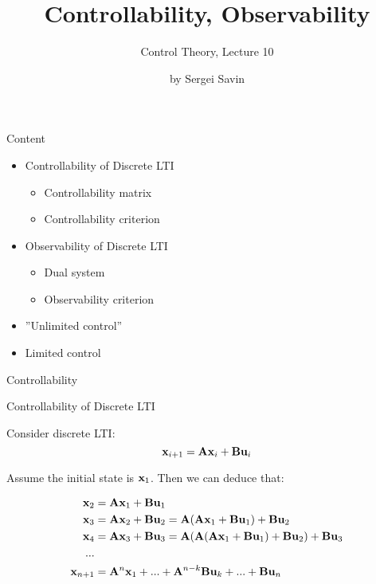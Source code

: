 \documentclass{beamer}
\title{Controllability, Observability}
\subtitle{Control Theory, Lecture 10}
\author{by Sergei Savin}
\date{\mydate}
\begin{document}
\maketitle


\begin{frame}{Content}
\begin{itemize}
\item Controllability of Discrete LTI
\begin{itemize}
    \item Controllability matrix
    \item Controllability criterion
\end{itemize}
\item Observability of Discrete LTI
\begin{itemize}
    \item Dual system
    \item Observability criterion
\end{itemize}
\item ”Unlimited control”
\item Limited control
\end{itemize}
\end{frame}



\begin{frame}{Controllability}
	\begin{flushleft}
		
		
		
	\end{flushleft}
\end{frame}


\begin{frame}{Controllability of Discrete LTI}
\begin{flushleft}

Consider discrete LTI:
\begin{equation}
\mathbf{x}_{i+1} = \mathbf{A}  \mathbf{x}_i + \mathbf{B} \mathbf{u}_i
\end{equation}

Assume the initial state is $\mathbf{x}_1$. Then we can deduce that:

\begin{align*}
\mathbf{x}_2 &= \mathbf{A} \mathbf{x}_1 + \mathbf{B} \mathbf{u}_1 \\
\mathbf{x}_3 &= \mathbf{A} \mathbf{x}_2 + \mathbf{B} \mathbf{u}_2 = \mathbf{A} (\mathbf{A} \mathbf{x}_1 + \mathbf{B} \mathbf{u}_1) + \mathbf{B} \mathbf{u}_2 \\
\mathbf{x}_4 &= \mathbf{A} \mathbf{x}_3 + \mathbf{B} \mathbf{u}_3 = \mathbf{A} (\mathbf{A} (\mathbf{A} \mathbf{x}_1 + \mathbf{B} \mathbf{u}_1) + \mathbf{B} \mathbf{u}_2) + \mathbf{B} \mathbf{u}_3 \\
... \\
\mathbf{x}_{n+1} &= \mathbf{A}^n \mathbf{x}_1 + ... + 
\mathbf{A}^{n - k} \mathbf{B} \mathbf{u}_{k} + ... + 
\mathbf{B} \mathbf{u}_n
\end{align*}

\end{flushleft}
\end{frame}
\end{document}
